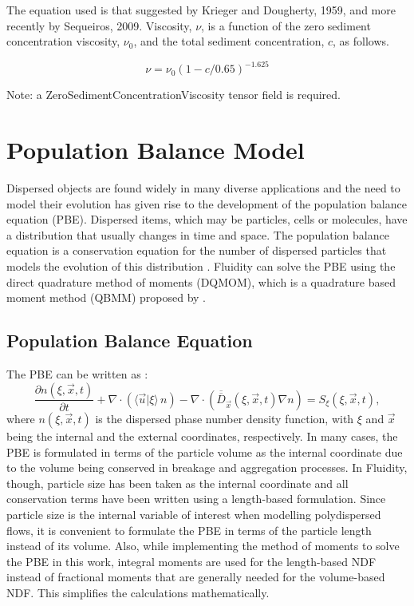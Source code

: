 The equation used is that suggested by Krieger and Dougherty, 1959, and more recently by
Sequeiros, 2009.  Viscosity, $\nu$, is a function of the zero sediment concentration
viscosity, $\nu_0$, and the total sediment concentration, $c$, as follows.

\begin{equation}\label{eq:sediment_concentration_dependent_viscosity}
  \nu = \nu_{0}(1-c/0.65)^{-1.625}
\end{equation}

Note: a ZeroSedimentConcentrationViscosity tensor field is required.

\newpage

\section{Population Balance Model}

Dispersed objects are found widely in many diverse applications and the need to model their evolution has given rise to the development of the population balance equation (PBE). Dispersed items, which may be particles, cells or molecules, have a distribution that usually changes in time and space. The population balance equation is a conservation equation for the number of dispersed particles that models the evolution of this distribution \citep{ramkrishna2000population}. Fluidity can solve the PBE using the direct quadrature method of moments (DQMOM), which is a quadrature based moment method (QBMM) proposed by \citet{marchisio2005solution}.

\subsection{Population Balance Equation}
The PBE can be written as \citep{ramkrishna2000population}:
\begin{equation}
\frac{\partial n(\xi,\vec{x},t)}{\partial t} + \nabla \cdot \left( \langle \vec{u}|\xi \rangle \, n \right) - \nabla \cdot \left( \overline{\overline D}_\vec{x} (\xi,\vec{x},t) \nabla n \right) = S_\xi (\xi,\vec{x},t),
\label{eq:pbe}
\end{equation}
where $n(\xi,\vec{x},t)$ is the dispersed phase number density function, with $\xi$ and $\vec{x}$  being the internal and the external coordinates, respectively. 
In many cases, the PBE is formulated in terms of the particle volume as the internal coordinate due to the volume being conserved in breakage and aggregation processes. 
In Fluidity, though, particle size has been taken as the internal coordinate and all conservation terms have been written using a length-based formulation. Since particle size is the internal variable of interest when modelling polydispersed flows, it is convenient to formulate the PBE in terms of the particle length instead of its volume. Also, while implementing the method of moments to solve the PBE in this work, integral moments are used for the length-based NDF instead of fractional moments that are generally needed for the volume-based NDF. This simplifies the calculations mathematically.

